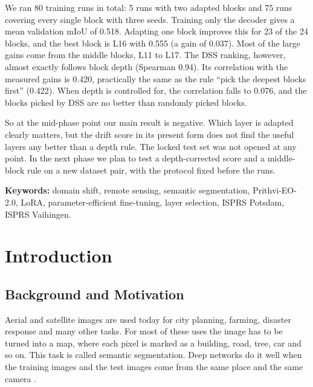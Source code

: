 \documentclass[11pt,a4paper]{report}
\newif\ifblankpage
\newcommand{\blankpage}{%
  \clearpage\blankpagetrue\thispagestyle{empty}\null\clearpage
  \blankpagefalse\addtocounter{page}{-1}}
\begin{document}
We ran 80 training runs in total: 5 runs with two adapted blocks and 75 runs covering every single block with three seeds. Training only the decoder gives a mean validation mIoU of 0.518. Adapting one block improves this for 23 of the 24 blocks, and the best block is L16 with 0.555 (a gain of 0.037). Most of the large gains come from the middle blocks, L11 to L17. The DSS ranking, however, almost exactly follows block depth (Spearman 0.94). Its correlation with the measured gains is 0.420, practically the same as the rule ``pick the deepest blocks first'' (0.422). When depth is controlled for, the correlation falls to 0.076, and the blocks picked by DSS are no better than randomly picked blocks.

So at the mid-phase point our main result is negative. Which layer is adapted clearly matters, but the drift score in its present form does not find the useful layers any better than a depth rule. The locked test set was not opened at any point. In the next phase we plan to test a depth-corrected score and a middle-block rule on a new dataset pair, with the protocol fixed before the runs.

\textbf{Keywords:} domain shift, remote sensing, semantic segmentation, Prithvi-EO-2.0, LoRA, parameter-efficient fine-tuning, layer selection, ISPRS Potsdam, ISPRS Vaihingen.

\blankpage

\tableofcontents
\newpage
\listoffigures
\listoftables
\blankpage

\twocolumn
{}

\chapter{Introduction}

\section{Background and Motivation}

Aerial and satellite images are used today for city planning, farming, disaster response and many other tasks. For most of these uses the image has to be turned into a map, where each pixel is marked as a building, road, tree, car and so on. This task is called semantic segmentation. Deep networks do it well when the training images and the test images come from the same place and the same camera \cite{long2015fully}.
\end{document}
